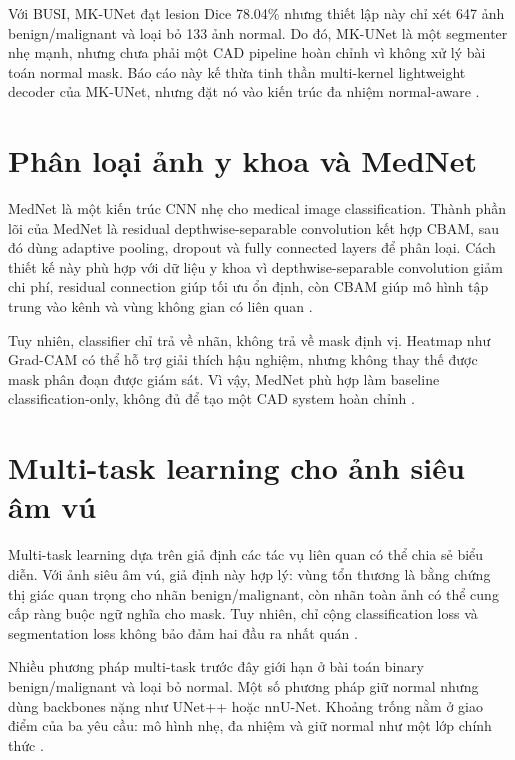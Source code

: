 \documentclass[12pt,a4paper,oneside]{report}
\begin{document}
Với BUSI, MK-UNet đạt lesion Dice 78.04\% nhưng thiết lập này chỉ xét 647 ảnh benign/malignant và loại bỏ 133 ảnh normal. Do đó, MK-UNet là một segmenter nhẹ mạnh, nhưng chưa phải một CAD pipeline hoàn chỉnh vì không xử lý bài toán normal mask. Báo cáo này kế thừa tinh thần multi-kernel lightweight decoder của MK-UNet, nhưng đặt nó vào kiến trúc đa nhiệm normal-aware \citep{busi,mkunet,damknet}.

\section{Phân loại ảnh y khoa và MedNet}

MedNet là một kiến trúc CNN nhẹ cho medical image classification. Thành phần lõi của MedNet là residual depthwise-separable convolution kết hợp CBAM, sau đó dùng adaptive pooling, dropout và fully connected layers để phân loại. Cách thiết kế này phù hợp với dữ liệu y khoa vì depthwise-separable convolution giảm chi phí, residual connection giúp tối ưu ổn định, còn CBAM giúp mô hình tập trung vào kênh và vùng không gian có liên quan \citep{xception,mobilenetv2,cbam,mednet}.

Tuy nhiên, classifier chỉ trả về nhãn, không trả về mask định vị. Heatmap như Grad-CAM có thể hỗ trợ giải thích hậu nghiệm, nhưng không thay thế được mask phân đoạn được giám sát. Vì vậy, MedNet phù hợp làm baseline classification-only, không đủ để tạo một CAD system hoàn chỉnh \citep{gradcam,mednet,damknet}.

\section{Multi-task learning cho ảnh siêu âm vú}

Multi-task learning dựa trên giả định các tác vụ liên quan có thể chia sẻ biểu diễn. Với ảnh siêu âm vú, giả định này hợp lý: vùng tổn thương là bằng chứng thị giác quan trọng cho nhãn benign/malignant, còn nhãn toàn ảnh có thể cung cấp ràng buộc ngữ nghĩa cho mask. Tuy nhiên, chỉ cộng classification loss và segmentation loss không bảo đảm hai đầu ra nhất quán \citep{zhou,aumente,damknet}.

Nhiều phương pháp multi-task trước đây giới hạn ở bài toán binary benign/malignant và loại bỏ normal. Một số phương pháp giữ normal nhưng dùng backbones nặng như UNet++ hoặc nnU-Net. Khoảng trống nằm ở giao điểm của ba yêu cầu: mô hình nhẹ, đa nhiệm và giữ normal như một lớp chính thức \citep{zhou,aumente,unetpp,damknet}.
\end{document}
